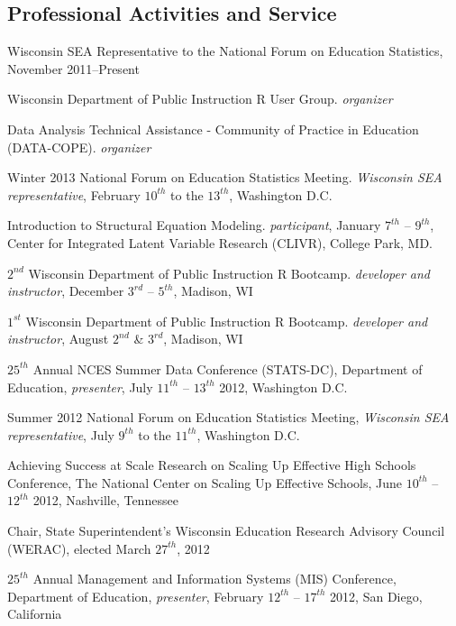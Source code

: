 \documentclass[margin,line]{res}
\begin{document}
\begin{resume}
\section{\sc Professional Activities and Service}

Wisconsin SEA Representative to the National Forum on Education Statistics, November 2011--Present

Wisconsin Department of Public Instruction R User Group. \emph{organizer}

Data Analysis Technical Assistance - Community of Practice in Education (DATA-COPE). \emph{organizer} 


Winter 2013 National Forum on Education Statistics Meeting. \emph{Wisconsin SEA representative}, February $10^{th}$ to the $13^{th}$, Washington D.C.

Introduction to Structural Equation Modeling. \emph{participant}, January $7^{th}$ -- $9^{th}$, Center for Integrated Latent Variable Research (CLIVR), College Park, MD.

$2^{nd}$ Wisconsin Department of Public Instruction R Bootcamp. \emph{developer and instructor}, December $3^{rd}$ -- $5^{th}$, Madison, WI

$1^{st}$ Wisconsin Department of Public Instruction R Bootcamp. \emph{developer and instructor}, August $2^{nd}$ \& $3^{rd}$, Madison, WI

$25^{th}$ Annual NCES Summer Data Conference (STATS-DC), Department of Education, \emph{presenter}, July $11^{th}$ -- $13^{th}$ 2012, Washington D.C.

Summer 2012 National Forum on Education Statistics Meeting, \emph{Wisconsin SEA representative}, July $9^{th}$ to the $11^{th}$, Washington D.C.

Achieving Success at Scale Research on Scaling Up Effective High Schools Conference, The National Center on Scaling Up Effective Schools, June $10^{th}$ -- $12^{th}$ 2012, Nashville, Tennessee


Chair, State Superintendent's Wisconsin Education Research Advisory Council (WERAC), elected March $27^{th}$, 2012

$25^{th}$ Annual Management and Information Systems (MIS) Conference, Department of Education, \emph{presenter}, February $12^{th}$ -- $17^{th}$ 2012, San Diego, California


\end{resume}
\end{document}

